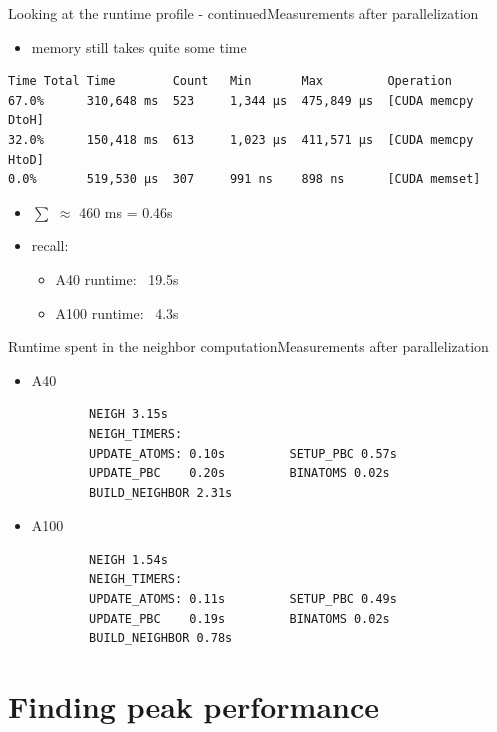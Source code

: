 \documentclass[ignorenonframetext,aspectratio=169]{beamer}
\begin{document}
\begin{frame}[fragile]{Looking at the runtime profile - continued}{Measurements after parallelization}
    \begin{itemize}
        \item memory still takes quite some time
    \end{itemize}
\begin{verbatim}
Time Total Time        Count   Min       Max         Operation
67.0%      310,648 ms  523     1,344 μs  475,849 μs  [CUDA memcpy DtoH]
32.0%      150,418 ms  613     1,023 μs  411,571 μs  [CUDA memcpy HtoD]
0.0%       519,530 μs  307     991 ns    898 ns      [CUDA memset]
\end{verbatim}

\begin{itemize}
    \item $\sum$ $\approx$ 460 ms = 0.46s
    \item recall:
    \begin{itemize}
        \item A40 runtime: ~19.5s
        \item A100 runtime: ~4.3s
    \end{itemize}
\end{itemize}
\end{frame}

\begin{frame}[fragile]{Runtime spent in the neighbor computation}{Measurements after parallelization}
    \begin{itemize}
        \item A40\begin{verbatim}
        NEIGH 3.15s
        NEIGH_TIMERS: 
        UPDATE_ATOMS: 0.10s         SETUP_PBC 0.57s 
        UPDATE_PBC    0.20s         BINATOMS 0.02s 
        BUILD_NEIGHBOR 2.31s
        \end{verbatim}
        \item A100 \begin{verbatim}
        NEIGH 1.54s 
        NEIGH_TIMERS: 
        UPDATE_ATOMS: 0.11s         SETUP_PBC 0.49s 
        UPDATE_PBC    0.19s         BINATOMS 0.02s 
        BUILD_NEIGHBOR 0.78s
        \end{verbatim}
    \end{itemize}
\end{frame}

\section{Finding peak performance}
\end{document}
